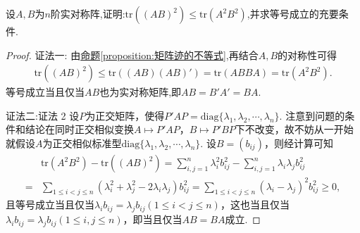 \documentclass[../../main.tex]{subfiles}
\begin{document}
\begin{example}
设\(A,B\)为\(n\)阶实对称阵,证明:\(\text{tr}((AB)^2)\leqslant \text{tr}(A^2B^2)\),并求等号成立的充要条件.
\end{example}
\begin{proof}
{\color{blue}证法一:}
由\hyperref[proposition:矩阵迹的不等式]{命题\ref{proposition:矩阵迹的不等式}},再结合$A,B$的对称性可得
\begin{align*}
\mathrm{tr}\left( \left( AB \right) ^2 \right) \leqslant \mathrm{tr}\left( \left( AB \right) \left( AB \right) \prime \right) =\mathrm{tr}\left( ABBA \right) =\mathrm{tr}\left( A^2B^2 \right) .
\end{align*}
等号成立当且仅当$AB$也为实对称矩阵,即\(AB = B'A'=BA\).

{\color{blue}证法二:}证法 2 设\(P\)为正交矩阵，使得\(P'AP = \mathrm{diag}\{\lambda_1,\lambda_2,\cdots,\lambda_n\}\). 注意到问题的条件和结论在同时正交相似变换\(A\mapsto P'AP\)，\(B\mapsto P'BP\)下不改变，故不妨从一开始就假设\(A\)为正交相似标准型\(\mathrm{diag}\{\lambda_1,\lambda_2,\cdots,\lambda_n\}\). 设\(B=(b_{ij})\)，则经计算可知
\begin{align*}
&\mathrm{tr}(A^2B^2)-\mathrm{tr}((AB)^2)=\sum_{i,j = 1}^{n}\lambda_i^2b_{ij}^2-\sum_{i,j = 1}^{n}\lambda_i\lambda_jb_{ij}^2\\
=&\sum_{1\leqslant  i<j\leqslant  n}(\lambda_i^2+\lambda_j^2 - 2\lambda_i\lambda_j)b_{ij}^2=\sum_{1\leqslant  i<j\leqslant  n}(\lambda_i - \lambda_j)^2b_{ij}^2\geqslant 0,
\end{align*}
且等号成立当且仅当\(\lambda_ib_{ij}=\lambda_jb_{ij}(1\leqslant  i<j\leqslant  n)\)，这也当且仅当\(\lambda_ib_{ij}=\lambda_jb_{ij}(1\leqslant  i,j\leqslant  n)\)，即当且仅当\(AB = BA\)成立. 
\end{proof}
\end{document}
